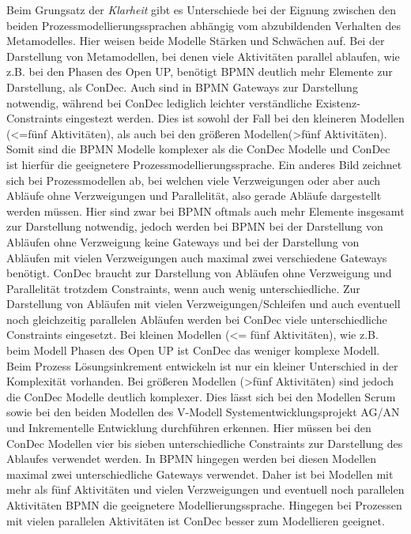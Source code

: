 {Beim Grungsatz der \textit{Klarheit} gibt es Unterschiede bei der Eignung zwischen den beiden Prozessmodellierungssprachen abhängig vom abzubildenden Verhalten des Metamodelles. Hier weisen beide Modelle Stärken und Schwächen auf. \newline
Bei der Darstellung von Metamodellen, bei denen viele Aktivitäten parallel ablaufen, wie z.B. bei den Phasen des Open UP, benötigt BPMN deutlich mehr Elemente zur Darstellung, als ConDec. Auch sind in BPMN Gateways zur Darstellung notwendig, während bei ConDec lediglich leichter verständliche Existenz-Constraints eingestezt werden. Dies ist sowohl der Fall bei den kleineren Modellen (<=fünf Aktivitäten), als auch bei den größeren Modellen(>fünf Aktivitäten). Somit sind die BPMN Modelle komplexer als die ConDec Modelle und ConDec ist hierfür die geeignetere Prozessmodellierungssprache. \newline
Ein anderes Bild zeichnet sich bei Prozessmodellen ab, bei welchen viele Verzweigungen oder aber auch Abläufe ohne Verzweigungen und Parallelität, also gerade Abläufe dargestellt werden müssen. Hier sind zwar bei BPMN oftmals auch mehr Elemente insgesamt zur Darstellung notwendig, jedoch werden bei BPMN bei der Darstellung von Abläufen ohne Verzweigung keine Gateways und bei der Darstellung von Abläufen mit vielen Verzweigungen auch maximal zwei verschiedene Gateways benötigt. ConDec braucht zur Darstellung von Abläufen ohne Verzweigung und Parallelität trotzdem Constraints, wenn auch wenig unterschiedliche. Zur Darstellung von Abläufen mit vielen Verzweigungen/Schleifen und auch eventuell noch gleichzeitig parallelen Abläufen werden bei ConDec viele unterschiedliche Constraints eingesetzt. Bei kleinen Modellen (<= fünf Aktivitäten), wie z.B. beim Modell Phasen des Open UP ist ConDec das weniger komplexe Modell. Beim Prozess Lösungsinkrement entwickeln ist nur ein kleiner Unterschied in der Komplexität vorhanden. Bei größeren Modellen (>fünf Aktivitäten) sind jedoch die ConDec Modelle deutlich komplexer. Dies lässt sich bei den Modellen Scrum sowie bei den beiden Modellen des V-Modell Systementwicklungsprojekt AG/AN und Inkrementelle Entwicklung durchführen erkennen. Hier müssen bei den ConDec Modellen vier bis sieben unterschiedliche Constraints zur Darstellung des Ablaufes verwendet werden. In BPMN hingegen werden bei diesen Modellen maximal zwei unterschiedliche Gateways verwendet. Daher ist bei Modellen mit mehr als fünf Aktivitäten und vielen Verzweigungen und eventuell noch parallelen Aktivitäten BPMN die geeignetere Modellierungssprache. Hingegen bei Prozessen mit vielen parallelen Aktivitäten ist ConDec besser zum Modellieren geeignet.\newline

}
